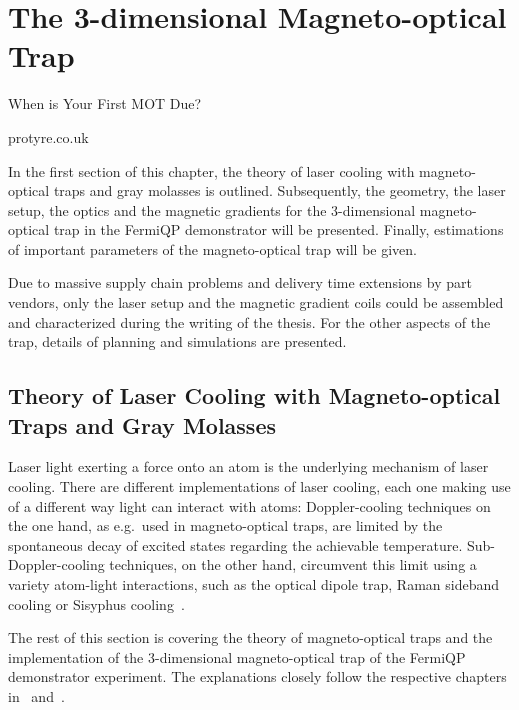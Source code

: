 \renewcommand{\imagepath}{../30-mot/img}

\chapter{The 3-dimensional Magneto-optical Trap}
\epigraph{When is Your First MOT Due?}{protyre.co.uk}

In the first section of this chapter, the theory of laser cooling with magneto-optical traps and gray molasses is outlined. Subsequently, the geometry, the laser setup, the optics and the magnetic gradients for the 3-dimensional magneto-optical trap in the FermiQP demonstrator will be presented. Finally, estimations of important parameters of the magneto-optical trap will be given.

Due to massive supply chain problems and delivery time extensions by part vendors, only the laser setup and the magnetic gradient coils could be assembled and characterized during the writing of the thesis. For the other aspects of the trap, details of planning and simulations are presented.

\section{Theory of Laser Cooling with Magneto-optical Traps and Gray Molasses}

Laser light exerting a force onto an atom is the underlying mechanism of laser cooling. There are different implementations of laser cooling, each one making use of a different way light can interact with atoms: Doppler-cooling techniques on the one hand, as e.g.\ used in magneto-optical traps, are limited by the spontaneous decay of excited states regarding the achievable temperature. Sub-Doppler-cooling techniques, on the other hand, circumvent this limit using a variety atom-light interactions, such as the optical dipole trap, Raman sideband cooling or Sisyphus cooling~\cite{foot_atomic_2005}.

The rest of this section is covering the theory of magneto-optical traps and the implementation of the 3-dimensional magneto-optical trap of the FermiQP demonstrator experiment. The explanations closely follow the respective chapters in~\cite{foot_atomic_2005} and~\cite{metcalf_laser_1999}.

